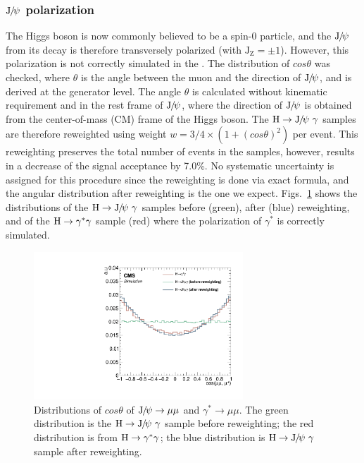 		\subsubsection*{${\mathrm{J}\hspace{-.08em}/\hspace{-.14em}\psi}$ polarization}
		The Higgs boson is now commonly believed to be a spin-0 particle, and the ${\mathrm{J}\hspace{-.08em}/\hspace{-.14em}\psi}$ from its decay is therefore transversely polarized (with $\text{J}_{\text{Z}}=\pm 1$). However, this polarization is not correctly simulated in the \PYTHIA. The distribution of $cos\theta$ was checked, where $\theta$ is the angle between the muon and the direction of ${\mathrm{J}\hspace{-.08em}/\hspace{-.14em}\psi}$, and is derived at the generator level. The angle $\theta$ is calculated without kinematic requirement and in the rest frame of ${\mathrm{J}\hspace{-.08em}/\hspace{-.14em}\psi}$, where the direction of ${\mathrm{J}\hspace{-.08em}/\hspace{-.14em}\psi}$ is obtained from the center-of-mass (CM) frame of the Higgs boson. 
		The $\PH\to\JPsi\ \gamma$ samples are therefore reweighted using weight $w = 3/4\times(1+(cos\theta)^{2})$ per event. This reweighting preserves the total number of events in the samples, however, results in a decrease of the signal acceptance by 7.0\%.
		No systematic uncertainty is assigned for this procedure since the reweighting is done via exact formula, and the angular distribution after reweighting is the one we expect. 
		Figs.~\ref{fig:JpsiPolarization} shows the distributions of the $\PH\to\JPsi\ \gamma$ samples before (green), after (blue) reweighting, and of the $\mathrm{H}\to\gamma^{*}\gamma$ sample (red) where the polarization of $\gamma^{*}$ is correctly simulated.
		
		\begin{figure}[!ht]\begin{center}
		  \includegraphics[width=0.7\textwidth]{Fig/GenLevel_HJpsiG/Jpsi_Polarization_H_new}
		  \caption{Distributions of $cos\theta$ of ${\mathrm{J}\hspace{-.08em}/\hspace{-.14em}\psi}\to\mu\mu$ and $\gamma^{*}\to\mu\mu$. The green distribution is the $\PH\to \JPsi\ \gamma$ sample before reweighting; the red distribution is from $\mathrm{H}\to \gamma^{*}\gamma$; the blue distribution is $\PH\to \JPsi\ \gamma$ sample after reweighting.}
		\label{fig:JpsiPolarization}\end{center}\end{figure} 
		
